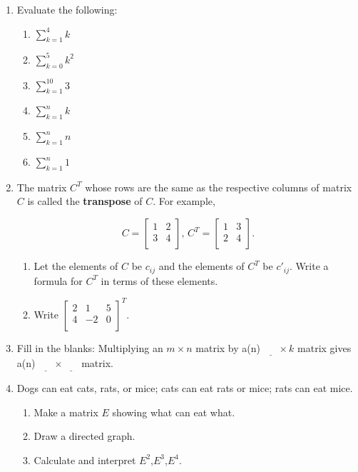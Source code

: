 \documentclass[../gatm.tex]{subfiles}
\begin{document}
\begin{enumerate}
\setcounter{enumi}{\value{mtrx_mult_problem_i}}
\item Evaluate the following:
\begin{multicols}{6}
\begin{enumerate}
\item $\displaystyle\sum_{k=1}^4 k$
\item $\displaystyle\sum_{k=0}^5 k^2$
\item $\displaystyle\sum_{k=1}^10 3$
\item $\displaystyle\sum_{k=1}^n k$
\item $\displaystyle\sum_{k=1}^n n$
\item $\displaystyle\sum_{k=1}^n 1$
\end{enumerate}
\end{multicols}

\item The matrix $C^T$ whose rows are the same as the respective columns of matrix $C$ is called the \textbf{transpose} of $C$. For example,

$$C=\left[\begin{array}{cc}
1 & 2 \\
3 & 4 \\
\end{array}\right],\, C^T=\left[\begin{array}{cc}
1 & 3 \\
2 & 4 \\
\end{array}\right].$$

\begin{enumerate}
\item Let the elements of $C$ be $c_{ij}$ and the elements of $C^T$ be $c'_{ij}$. Write a formula for $C^T$ in terms of these elements.
\item Write $\left[\begin{array}{ccc}
2 & 1 & 5 \\
4 & -2 & 0 \\
\end{array}\right]^T$.
\end{enumerate}
\item Fill in the blanks: Multiplying an $m\times n$ matrix by a(n) $\underline{\phantom{egg}} \times k$ matrix gives a(n) $\underline{\phantom{egg}}\times\underline{\phantom{egg}}$ matrix.
\item Dogs can eat cats, rats, or mice; cats can eat rats or mice; rats can eat mice.
\begin{enumerate}
\item Make a matrix $E$ showing what can eat what.
\item Draw a directed graph.
\item Calculate and interpret $E^2$,$E^3$,$E^4$.
\end{enumerate}
\setcounter{mtrx_mult_problem_i}{\value{enumi}}
\end{enumerate}
\end{document}
